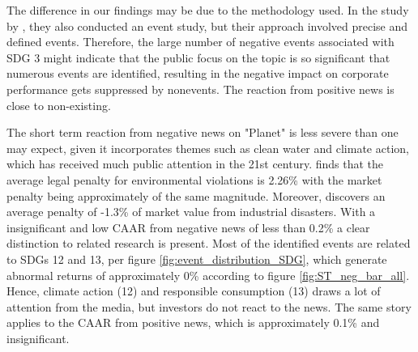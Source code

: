The difference in our findings may be due to the methodology used. In the study by \citeauthor{chen2001layoffs}, they also conducted an event study, but their approach involved precise and defined events. Therefore, the large number of negative events associated with SDG 3 might indicate that the public focus on the topic is so significant that numerous events are identified, resulting in the negative impact on corporate performance gets suppressed by nonevents. The reaction from positive news is close to non-existing. 

The short term reaction from negative news on "Planet" is less severe than one may expect, given it incorporates themes such as clean water and climate action, which has received much public attention in the 21st century. \cite{karpoff2005reputational} finds that the average legal penalty for environmental violations is 2.26\% with the market penalty being approximately of the same magnitude. Moreover, \cite{capelle2010does} discovers an average penalty of -1.3\% of market value from industrial disasters. With a insignificant and low CAAR from negative news of less than 0.2\% a clear distinction to related research is present. Most of the identified events are related to SDGs 12 and 13, per figure \ref{fig:event_distribution_SDG}, which generate abnormal returns of approximately 0\% according to figure \ref{fig:ST_neg_bar_all}. Hence, climate action (12) and responsible consumption (13) draws a lot of attention from the media, but investors do not react to the news. The same story applies to the CAAR from positive news, which is approximately 0.1\% and insignificant. 

